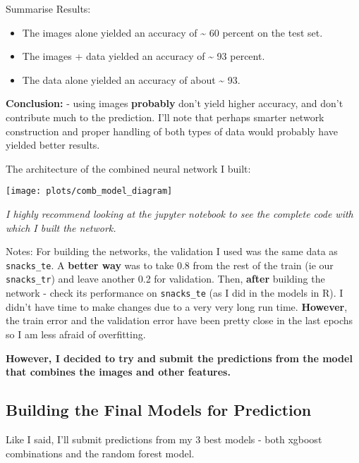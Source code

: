 \documentclass[
]{article}
\providecommand{\tightlist}{%
  \setlength{\itemsep}{0pt}\setlength{\parskip}{0pt}}
\begin{document}
Summarise Results:

\begin{itemize}
\tightlist
\item
  The images alone yielded an accuracy of \textasciitilde{} 60 percent
  on the test set.
\item
  The images + data yielded an accuracy of \textasciitilde{} 93 percent.
\item
  The data alone yielded an accuracy of about \textasciitilde{} 93.
\end{itemize}

\textbf{Conclusion:} - using images \textbf{probably} don't yield higher
accuracy, and don't contribute much to the prediction. I'll note that
perhaps smarter network construction and proper handling of both types
of data would probably have yielded better results.

The architecture of the combined neural network I built:

\begin{center}\texttt{[image: plots/comb\_model\_diagram]} \end{center}

\emph{I highly recommend looking at the jupyter notebook to see the
complete code with which I built the network.}

Notes: For building the networks, the validation I used was the same
data as \texttt{snacks\_te}. A \textbf{better way} was to take 0.8 from
the rest of the train (ie our \texttt{snacks\_tr}) and leave another 0.2
for validation. Then, \textbf{after} building the network - check its
performance on \texttt{snacks\_te} (as I did in the models in R). I
didn't have time to make changes due to a very very long run time.
\textbf{However}, the train error and the validation error have been
pretty close in the last epochs so I am less afraid of overfitting.

\textbf{However, I decided to try and submit the predictions from the
model that combines the images and other features.}

\hypertarget{building-the-final-models-for-prediction}{%
\subsection{Building the Final Models for
Prediction}\label{building-the-final-models-for-prediction}}

Like I said, I'll submit predictions from my 3 best models - both
xgboost combinations and the random forest model.
\end{document}
